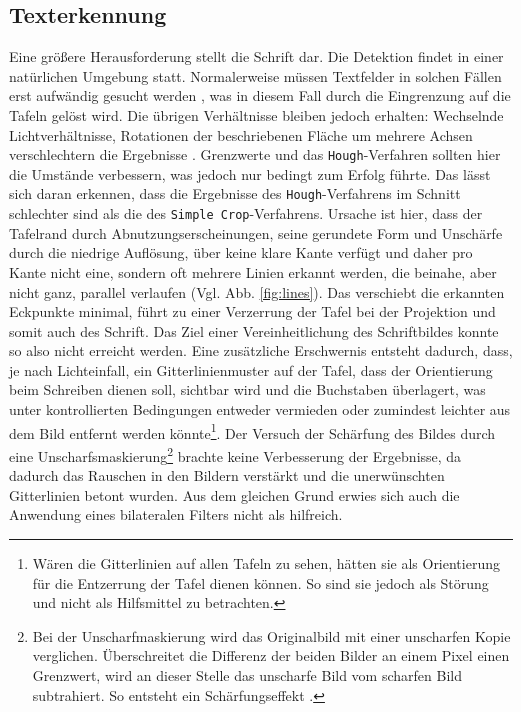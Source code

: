 \subsection{Texterkennung}
\label{section:diskussiontexterkennung}
Eine größere Herausforderung stellt die Schrift dar.
Die Detektion findet in einer natürlichen Umgebung statt. Normalerweise müssen Textfelder in solchen Fällen erst aufwändig gesucht werden \cite{qixiangye}, was in diesem Fall durch die Eingrenzung auf die Tafeln gelöst wird. Die übrigen Verhältnisse bleiben jedoch erhalten: Wechselnde Lichtverhältnisse, Rotationen der beschriebenen Fläche um mehrere Achsen verschlechtern die Ergebnisse \cite{xilinchen}{} \cite{tesseractoptimum}. Grenzwerte und das \verb|Hough|-Verfahren sollten hier die Umstände verbessern, was jedoch nur bedingt zum Erfolg führte. Das lässt sich daran erkennen, dass die Ergebnisse des \verb|Hough|-Verfahrens im Schnitt schlechter sind als die des \verb|Simple Crop|-Verfahrens. Ursache ist hier, dass der Tafelrand durch Abnutzungserscheinungen, seine gerundete Form und Unschärfe durch die niedrige Auflösung, über keine klare Kante verfügt und daher pro Kante nicht eine, sondern oft mehrere Linien erkannt werden, die beinahe, aber nicht ganz, parallel verlaufen (Vgl. Abb. \ref{fig:lines}). Das verschiebt die erkannten Eckpunkte minimal, führt zu einer Verzerrung der Tafel bei der Projektion und somit auch des Schrift. Das Ziel einer Vereinheitlichung des Schriftbildes konnte so also nicht erreicht werden. Eine zusätzliche Erschwernis entsteht dadurch, dass, je nach Lichteinfall, ein Gitterlinienmuster auf der Tafel, dass der Orientierung beim Schreiben dienen soll, sichtbar wird und die Buchstaben überlagert, was unter kontrollierten Bedingungen entweder vermieden oder zumindest leichter aus dem Bild entfernt werden könnte\footnote{Wären die Gitterlinien auf allen Tafeln zu sehen, hätten sie als Orientierung für die Entzerrung der Tafel dienen können. So sind sie jedoch als Störung und nicht als Hilfsmittel zu betrachten.}.
Der Versuch der Schärfung des Bildes durch eine Unscharfsmaskierung\footnote{Bei der Unscharfmaskierung wird das Originalbild mit einer unscharfen Kopie verglichen. Überschreitet die Differenz der beiden Bilder an einem Pixel einen Grenzwert, wird an dieser Stelle das unscharfe Bild vom scharfen Bild subtrahiert. So entsteht ein Schärfungseffekt \cite{gimpsharpening}.} brachte keine Verbesserung der Ergebnisse, da dadurch das Rauschen in den Bildern verstärkt und die unerwünschten Gitterlinien betont wurden. Aus dem gleichen Grund erwies sich auch die Anwendung eines bilateralen Filters  \cite{tomasi}{} nicht als hilfreich.
